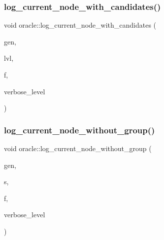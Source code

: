 \mbox{\label{classoracle_af54e0dc5a80b11489a5335006f33ca63}} 
\subsubsection{\texorpdfstring{log\+\_\+current\+\_\+node\+\_\+with\+\_\+candidates()}{log\_current\_node\_with\_candidates()}}
{\footnotesize\ttfamily void oracle\+::log\+\_\+current\+\_\+node\+\_\+with\+\_\+candidates (\begin{DoxyParamCaption}\item[{\mbox{\hyperlink{classgenerator}{generator}} $\ast$}]{gen,  }\item[{\mbox{\hyperlink{galois_8h_a09fddde158a3a20bd2dcadb609de11dc}{I\+NT}}}]{lvl,  }\item[{ostream \&}]{f,  }\item[{\mbox{\hyperlink{galois_8h_a09fddde158a3a20bd2dcadb609de11dc}{I\+NT}}}]{verbose\+\_\+level }\end{DoxyParamCaption})}

\mbox{\label{classoracle_a9400cea7437003969b89032e8626c148}} 
\subsubsection{\texorpdfstring{log\+\_\+current\+\_\+node\+\_\+without\+\_\+group()}{log\_current\_node\_without\_group()}}
{\footnotesize\ttfamily void oracle\+::log\+\_\+current\+\_\+node\+\_\+without\+\_\+group (\begin{DoxyParamCaption}\item[{\mbox{\hyperlink{classgenerator}{generator}} $\ast$}]{gen,  }\item[{\mbox{\hyperlink{galois_8h_a09fddde158a3a20bd2dcadb609de11dc}{I\+NT}}}]{s,  }\item[{ostream \&}]{f,  }\item[{\mbox{\hyperlink{galois_8h_a09fddde158a3a20bd2dcadb609de11dc}{I\+NT}}}]{verbose\+\_\+level }\end{DoxyParamCaption})}

